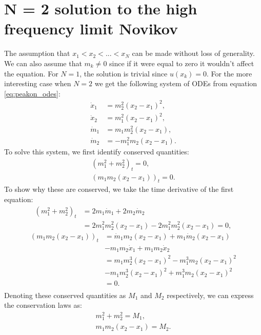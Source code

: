 \documentclass[english,master]{liumaiex}
\theoremstyle{plain}
\theoremstyle{definition}
\begin{document}
\section{N = 2 solution to the high frequency limit Novikov}
The assumption that $x_1 < x_2 < ... < x_N$ can be made without loss of generality. We can also assume that $m_k \neq 0$ since if it were equal to zero it wouldn't affect the equation.
For $N = 1$, the solution is trivial since $u(x_k) = 0$. For the more interesting case when $N = 2$ we get the following system of ODEs from equation \eqref{eq:peakon_odes}:
%
\begin{align}
	\dot{x}_1 & = m_2^2 (x_2 - x_1)^2, \\
	\dot{x}_2 & = m_1^2 (x_2 - x_1)^2, \\
	\dot{m}_1 & = m_1 m_2^2(x_2 - x_1),  \\
	\dot{m}_2 & = -m_1^2 m_2(x_2 - x_1).
\end{align}
%
To solve this system, we first identify conserved quantities:
\begin{align}
	(m_1^2 + m_2^2)_t = 0, \\
	(m_1m_2(x_2 - x_1))_t = 0.
\end{align}
%
To show why these are conserved, we take the time derivative of the first equation:
\begin{equation}
\begin{aligned}
	(m_1^2 + m_2^2)_t 
	&= 2m_1\dot{m}_1 + 2m_2\dot{m}_2 \\
	&= 2m_1^2m_2^2(x_2 - x_1) - 2m_1^2m_2^2(x_2 - x_1) = 0,
\end{aligned}
\end{equation}
\begin{equation}
\begin{aligned}
	(m_1m_2(x_2 - x_1))_t 
	&= \dot{m}_1m_2(x_2 - x_1) + m_1\dot{m}_2(x_2 - x_1) \\
	&- m_1m_2\dot{x}_1 + m_1m_2\dot{x}_2 \\
	&= m_1m_2^3(x_2 - x_1)^2 - m_1^3m_2(x_2 - x_1)^2 \\
	&- m_1m_2^3(x_2 - x_1)^2 + m_1^3m_2(x_2 - x_1)^2 \\
	&= 0. \\
\end{aligned}
\end{equation}
%
Denoting these conserved quantities as $M_1$ and $M_2$ respectively, we can express the conservation laws as:
\begin{align}
	m_1^2 + m_2^2 = M_1, \\
	m_1m_2(x_2 - x_1) = M_2.
\end{align}
\end{document}
